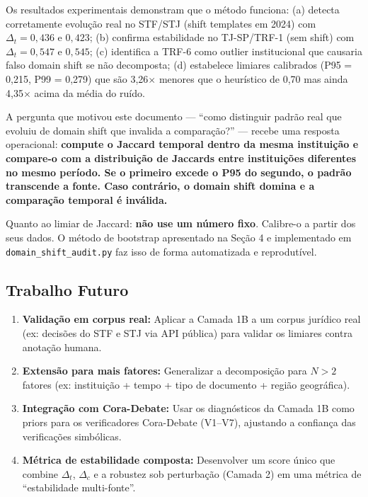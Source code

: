 \documentclass[12pt,a4paper]{article}
\theoremstyle{remark}
\begin{document}
Os resultados experimentais demonstram que o método funciona: (a) detecta corretamente evolução real no STF/STJ (shift templates em 2024) com $\Delta_t = 0,436$ e $0,423$; (b) confirma estabilidade no TJ-SP/TRF-1 (sem shift) com $\Delta_t = 0,547$ e $0,545$; (c) identifica a TRF-6 como outlier institucional que causaria falso domain shift se não decomposta; (d) estabelece limiares calibrados (P95 = 0,215, P99 = 0,279) que são 3,26$\times$ menores que o heurístico de 0,70 mas ainda 4,35$\times$ acima da média do ruído.

A pergunta que motivou este documento — ``como distinguir padrão real que evoluiu de domain shift que invalida a comparação?'' — recebe uma resposta operacional: \textbf{compute o Jaccard temporal dentro da mesma instituição e compare-o com a distribuição de Jaccards entre instituições diferentes no mesmo período. Se o primeiro excede o P95 do segundo, o padrão transcende a fonte. Caso contrário, o domain shift domina e a comparação temporal é inválida.}

Quanto ao limiar de Jaccard: \textbf{não use um número fixo}. Calibre-o a partir dos seus dados. O método de bootstrap apresentado na Seção 4 e implementado em \texttt{domain\_shift\_audit.py} faz isso de forma automatizada e reprodutível.

\subsection{Trabalho Futuro}

\begin{enumerate}[nosep]
  \item \textbf{Validação em corpus real:} Aplicar a Camada 1B a um corpus jurídico real (ex: decisões do STF e STJ via API pública) para validar os limiares contra anotação humana.
  \item \textbf{Extensão para mais fatores:} Generalizar a decomposição para $N > 2$ fatores (ex: instituição + tempo + tipo de documento + região geográfica).
  \item \textbf{Integração com Cora-Debate:} Usar os diagnósticos da Camada 1B como priors para os verificadores Cora-Debate (V1--V7), ajustando a confiança das verificações simbólicas.
  \item \textbf{Métrica de estabilidade composta:} Desenvolver um score único que combine $\Delta_t$, $\Delta_c$ e a robustez sob perturbação (Camada 2) em uma métrica de ``estabilidade multi-fonte''.
\end{enumerate}
\end{document}
